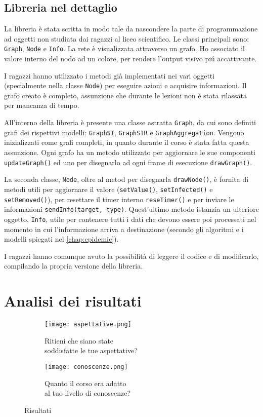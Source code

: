 \subsection{Libreria nel dettaglio}
La libreria è stata scritta in modo tale da nascondere la parte di programmazione ad oggetti non studiata dai ragazzi al liceo scientifico. Le classi principali sono: \texttt{Graph}, \texttt{Node} e \texttt{Info}. La rete è visualizzata attraverso un grafo. Ho associato il valore interno del nodo ad un colore, per rendere l'output visivo piú accattivante.

I ragazzi hanno utilizzato i metodi già implementati nei vari oggetti (specialmente nella classe \texttt{Node}) per eseguire azioni e acquisire informazioni. Il grafo creato è completo, assunzione che durante le lezioni non è stata rilassata per mancanza di tempo.

All'interno della libreria è presente una classe astratta \texttt{Graph}, da cui sono definiti grafi dei rispettivi modelli: \texttt{GraphSI}, \texttt{GraphSIR} e \texttt{GraphAggregation}. Vengono inizializzati come grafi completi, in quanto durante il corso è stata fatta questa assunzione. Ogni grafo ha un metodo utilizzato per aggiornare le sue componenti \texttt{updateGraph()} ed uno per disegnarlo ad ogni frame di esecuzione \texttt{drawGraph()}. 

La seconda classe, \texttt{Node}, oltre al metod per disegnarla \texttt{drawNode()}, è fornita di metodi utili per aggiornare il valore (\texttt{setValue()}, \texttt{setInfected()} e \texttt{setRemoved()}), per resettare il timer interno \texttt{reseTimer()} e per inviare le informazioni \texttt{sendInfo(target, type)}. Quest'ultimo metodo istanzia un ulteriore oggetto, \texttt{Info}, utile per contenere tutti i dati che devono essere poi processati nel momento in cui l'informazione arriva a destinazione (secondo gli algoritmi e i modelli spiegati nel \autoref{chap:epidemic}).

I ragazzi hanno comunque avuto la possibilità di leggere il codice e di modificarlo, compilando la propria versione della libreria.
\section{Analisi dei risultati}

\begin{figure}[ht]
    
    \begin{subfigure}{.5\textwidth}
        \centering
        \texttt{[image: aspettative.png]}
        \captionsetup{justification=centering}
        \caption{Ritieni che siano state \\ soddisfatte le tue aspettative?} 
    \end{subfigure}\hfill
    \begin{subfigure}{.5\textwidth}
        \centering
        \texttt{[image: conoscenze.png]}
        \captionsetup{justification=centering}
        \caption{Quanto il corso era adatto  \\ al tuo livello di conoscenze?} 
    \end{subfigure}
    \caption{Risultati}
\end{figure} 

